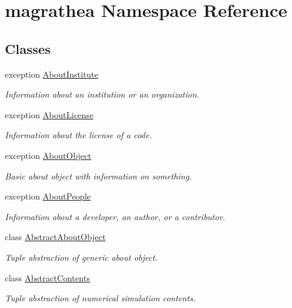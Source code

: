 \hypertarget{namespacemagrathea}{\section{magrathea Namespace Reference}
\label{namespacemagrathea}
}
\subsection*{Classes}
\begin{DoxyCompactItemize}
\item 
exception \hyperlink{exceptionmagrathea_1_1AboutInstitute}{About\-Institute}
\begin{DoxyCompactList}\small\item\em Information about an institution or an organization. \end{DoxyCompactList}\item 
exception \hyperlink{exceptionmagrathea_1_1AboutLicense}{About\-License}
\begin{DoxyCompactList}\small\item\em Information about the license of a code. \end{DoxyCompactList}\item 
exception \hyperlink{exceptionmagrathea_1_1AboutObject}{About\-Object}
\begin{DoxyCompactList}\small\item\em Basic about object with information on something. \end{DoxyCompactList}\item 
exception \hyperlink{exceptionmagrathea_1_1AboutPeople}{About\-People}
\begin{DoxyCompactList}\small\item\em Information about a developer, an author, or a contributor. \end{DoxyCompactList}\item 
class \hyperlink{classmagrathea_1_1AbstractAboutObject}{Abstract\-About\-Object}
\begin{DoxyCompactList}\small\item\em Tuple abstraction of generic about object. \end{DoxyCompactList}\item 
class \hyperlink{classmagrathea_1_1AbstractContents}{Abstract\-Contents}
\begin{DoxyCompactList}\small\item\em Tuple abstraction of numerical simulation contents. \end{DoxyCompactList}\item 

\end{DoxyCompactItemize}

